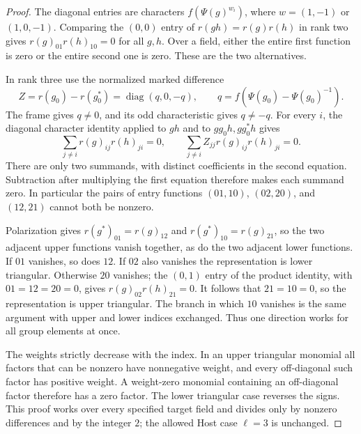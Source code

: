 \documentclass[11pt,a4paper]{article}
\numberwithin{equation}{section}
\theoremstyle{remark}\newtheorem{remark}[theorem]{Remark}
\begin{document}
\begin{proof}
The diagonal entries are characters
\(f(\Psi(g)^{w_i})\), where
\(w=(1,-1)\) or \((1,0,-1)\).  Comparing the \((0,0)\)
entry of \(r(gh)=r(g)r(h)\) in rank two gives
\(r(g)_{01}r(h)_{10}=0\) for all \(g,h\).  Over a field,
either the entire first function is zero or the entire second one
is zero.  These are the two alternatives.

In rank three use the normalized marked difference
\[
 Z=r(g_0)-r(g_0^*)=\operatorname{diag}(q,0,-q),
 \qquad q=f(\Psi(g_0)-\Psi(g_0)^{-1}).                       \tag{APD.16}
\]
The frame gives \(q\ne0\), and its odd characteristic gives
\(q\ne-q\).  For every \(i\), the diagonal character identity
applied to \(gh\) and to
\(gg_0h,gg_0^*h\) gives
\[
 \sum_{j\ne i}r(g)_{ij}r(h)_{ji}=0,
 \qquad
 \sum_{j\ne i}Z_{jj}r(g)_{ij}r(h)_{ji}=0.                 \tag{APD.17}
\]
There are only two summands, with distinct coefficients in the
second equation.  Subtraction after multiplying the first equation
therefore makes each summand zero.  In particular the pairs of
entry functions \((01,10)\), \((02,20)\), and \((12,21)\)
cannot both be nonzero.

Polarization gives \(r(g^*)_{01}=r(g)_{12}\) and
\(r(g^*)_{10}=r(g)_{21}\), so the two adjacent upper functions
vanish together, as do the two adjacent lower functions.  If
\(01\) vanishes, so does \(12\).  If \(02\) also vanishes
the representation is lower triangular.  Otherwise \(20\)
vanishes; the \((0,1)\) entry of the product identity, with
\(01=12=20=0\), gives
\(r(g)_{02}r(h)_{21}=0\).  It follows that \(21=10=0\),
so the representation is upper triangular.  The branch in which
\(10\) vanishes is the same argument with upper and lower
indices exchanged.  Thus one direction works for all group
elements at once.

The weights strictly decrease with the index.  In an upper
triangular monomial all factors that can be nonzero have
nonnegative weight, and every off-diagonal such factor has
positive weight.  A weight-zero monomial containing an
off-diagonal factor therefore has a zero factor.  The lower
triangular case reverses the signs.  This proof works over every
specified target field and divides only by nonzero differences
and by the integer \(2\); the allowed Host case \(\ell=3\)
is unchanged.
\end{proof}

\end{document}
